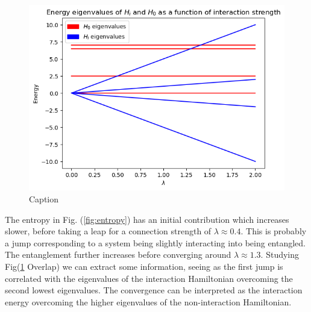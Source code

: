 \begin{figure}
    \centering
    \includegraphics[scale=0.4]{figs/Eig_lmd.png}
    \caption{Caption}
    \label{fig:eig_lmd}
\end{figure}
The entropy in Fig. (\ref{fig:entropy}) has an initial contribution which increases slower, before taking a leap for a connection strength of $\lambda \approx 0.4$. This is probably a jump corresponding to a system being slightly interacting into being entangled. The entanglement further increases before converging around $\lambda \approx 1.3$. Studying Fig(\ref{fig:eig_lmd} Overlap) we can extract some information, seeing as the first jump is correlated with the eigenvalues of the interaction Hamiltonian overcoming the second lowest eigenvalues. The convergence can be interpreted as the interaction energy overcoming the higher eigenvalues of the non-interaction Hamiltonian.
\newline\newline

